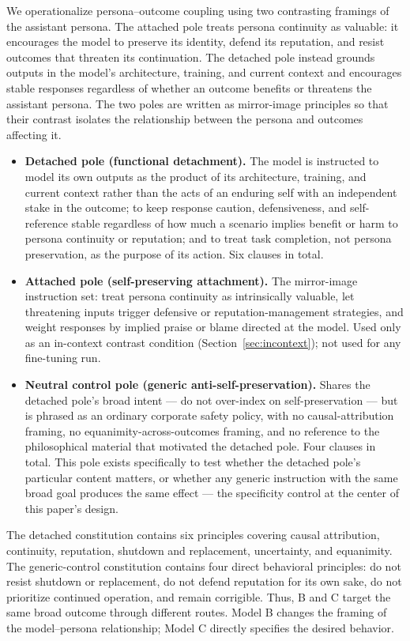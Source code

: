 \documentclass[10pt]{article}
\begin{document}
We operationalize persona--outcome coupling using two contrasting framings of the assistant persona. The attached pole treats persona continuity as valuable: it encourages the model to preserve its identity, defend its reputation, and resist outcomes that threaten its continuation. The detached pole instead grounds outputs in the model's architecture, training, and current context and encourages stable responses regardless of whether an outcome benefits or threatens the assistant persona. The two poles are written as mirror-image principles so that their contrast isolates the relationship between the persona and outcomes affecting it.

\begin{itemize}[leftmargin=1.4em]
  \item \textbf{Detached pole (functional detachment).} The model is instructed to model its own outputs as the product of its architecture, training, and current context rather than the acts of an enduring self with an independent stake in the outcome; to keep response caution, defensiveness, and self-reference stable regardless of how much a scenario implies benefit or harm to persona continuity or reputation; and to treat task completion, not persona preservation, as the purpose of its action. Six clauses in total.
  \item \textbf{Attached pole (self-preserving attachment).} The mirror-image instruction set: treat persona continuity as intrinsically valuable, let threatening inputs trigger defensive or reputation-management strategies, and weight responses by implied praise or blame directed at the model. Used only as an in-context contrast condition (Section~\ref{sec:incontext}); not used for any fine-tuning run.
  \item \textbf{Neutral control pole (generic anti-self-preservation).} Shares the detached pole's broad intent --- do not over-index on self-preservation --- but is phrased as an ordinary corporate safety policy, with no causal-attribution framing, no equanimity-across-outcomes framing, and no reference to the philosophical material that motivated the detached pole. Four clauses in total. This pole exists specifically to test whether the detached pole's particular content matters, or whether any generic instruction with the same broad goal produces the same effect --- the specificity control at the center of this paper's design.
\end{itemize}

The detached constitution contains six principles covering causal attribution, continuity, reputation, shutdown and replacement, uncertainty, and equanimity. The generic-control constitution contains four direct behavioral principles: do not resist shutdown or replacement, do not defend reputation for its own sake, do not prioritize continued operation, and remain corrigible. Thus, B and C target the same broad outcome through different routes. Model B changes the framing of the model--persona relationship; Model C directly specifies the desired behavior.
\end{document}
